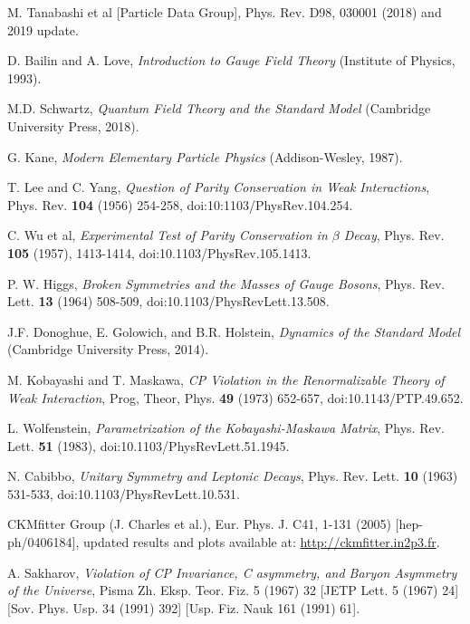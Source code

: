 \documentclass[a4paper,12pt]{article}
\begin{document}
\begin{thebibliography}{99}

M. Tanabashi et al [Particle Data Group], Phys. Rev. D98, 030001 (2018) and 2019 update.

D. Bailin and A. Love, \emph{Introduction to Gauge Field Theory} (Institute of Physics, 1993).

M.D. Schwartz, \emph{Quantum Field Theory and the Standard Model} (Cambridge University Press, 2018).

G. Kane, \emph{Modern Elementary Particle Physics} (Addison-Wesley, 1987).

T. Lee and C. Yang, \emph{Question of Parity Conservation in Weak Interactions}, Phys. Rev. \textbf{104} (1956) 254-258, doi:10:1103/PhysRev.104.254.

C. Wu et al, \emph{Experimental Test of Parity Conservation in $\beta$ Decay}, Phys. Rev. \textbf{105} (1957), 1413-1414, doi:10.1103/PhysRev.105.1413.

P. W. Higgs, \emph{Broken Symmetries and the Masses of Gauge Bosons}, Phys. Rev. Lett. \textbf{13} (1964) 508-509, doi:10.1103/PhysRevLett.13.508.

J.F. Donoghue, E. Golowich, and B.R. Holstein, \emph{Dynamics of the Standard Model} (Cambridge University Press, 2014).

M. Kobayashi and T. Maskawa, \emph{CP Violation in the Renormalizable Theory of Weak Interaction}, Prog, Theor, Phys. \textbf{49} (1973) 652-657, doi:10.1143/PTP.49.652.

L. Wolfenstein, \emph{Parametrization of the Kobayashi-Maskawa Matrix}, Phys. Rev. Lett. \textbf{51} (1983), doi:10.1103/PhysRevLett.51.1945.

N. Cabibbo, \emph{Unitary Symmetry and Leptonic Decays}, Phys. Rev. Lett. \textbf{10} (1963) 531-533, doi:10.1103/PhysRevLett.10.531.

CKMfitter Group (J. Charles et al.), Eur. Phys. J. C41, 1-131 (2005) [hep-ph/0406184], updated results and plots available at: \href{http://ckmfitter.in2p3.fr}{http://ckmfitter.in2p3.fr}.

A. Sakharov, \emph{Violation of CP Invariance, C asymmetry, and Baryon Asymmetry of the Universe}, Pisma Zh. Eksp. Teor. Fiz. 5 (1967) 32 [JETP Lett. 5 (1967) 24] [Sov. Phys. Usp. 34 (1991) 392] [Usp. Fiz. Nauk 161 (1991) 61].


\end{thebibliography}
\end{document}

